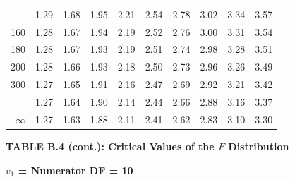 \documentclass[10pt]{article}
\begin{document}
\begin{longtable}{@{}r!{\vrule width 0.8pt\hspace{0.55em}}rrrrrrrrr@{}}
 & 1.29 & 1.68 & 1.95 & 2.21 & 2.54 & 2.78 & 3.02 & 3.34 & 3.57 \\
160 & 1.28 & 1.67 & 1.94 & 2.19 & 2.52 & 2.76 & 3.00 & 3.31 & 3.54 \\
180 & 1.28 & 1.67 & 1.93 & 2.19 & 2.51 & 2.74 & 2.98 & 3.28 & 3.51 \\
200 & 1.28 & 1.66 & 1.93 & 2.18 & 2.50 & 2.73 & 2.96 & 3.26 & 3.49 \\
300 & 1.27 & 1.65 & 1.91 & 2.16 & 2.47 & 2.69 & 2.92 & 3.21 & 3.42 \\
 & 1.27 & 1.64 & 1.90 & 2.14 & 2.44 & 2.66 & 2.88 & 3.16 & 3.37 \\
$\infty$ & 1.27 & 1.63 & 1.88 & 2.11 & 2.41 & 2.62 & 2.83 & 3.10 & 3.30 \\
\end{longtable}
\newpage
\thispagestyle{empty}
\begin{center}
{\large\bfseries TABLE B.4 (cont.): Critical Values of the $F$ Distribution\par}
\end{center}
{\large\bfseries $v_1$ = Numerator DF = 10\par}
\vspace{0.5em}
\small
\end{document}
